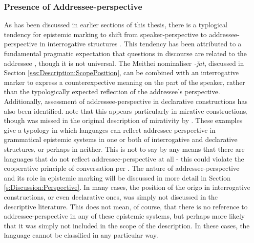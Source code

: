 \subsubsection{Presence of Addressee-perspective}\label{sss:Description:AddrPersp}
As has been discussed in earlier sections of this thesis, there is a typlogical tendency for epistemic marking to shift from speaker-perspective to addressee-perspective in interrogative structures \cite{Aikhenvald2004}. This tendency has been attributed to a fundamental pragmatic expectation that questions in discourse are related to the addressee \cite{Hill2020}, though it is not universal. The Meithei \cite[Internal Isolate: India,][296]{Chelliah1997} nominaliser \textit{-ǰat}, discussed in Section \ref{sss:Description:ScopePosition}, can be combined with an interrogative marker to express a counterexpective meaning on the part of the speaker, rather than the typologically expected reflection of the addressee's perspective. Additionally, assessment of addressee-perspective in declarative constructions has also been identified.  note that this appears particularly in mirative constructions, though was missed in the original description of mirativity by . These examples give a typology in which languages can reflect addressee-perspective in grammatical epistemic systems in one or both of interrogative and declarative structures, or perhaps in neither. This is not to say by any means that there are languages that do not reflect addressee-perspective at all - this could violate the cooperative principle of conversation per . The nature of addressee-perspective and its role in epistemic marking will be discussed in more detail in Section \ref{s:Discussion:Perspective}. In many cases, the position of the origo in interrogative constructions, or even declarative ones, was simply not discussed in the descriptive literature. This does not mean, of course, that there is no reference to addressee-perspective in any of these epistemic systems, but perhaps more likely that it was simply not included in the scope of the description. In these cases, the language cannot be classified in any particular way.

